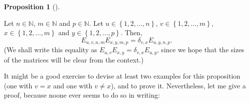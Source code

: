 \documentclass[numbers=enddot,12pt,final,onecolumn,notitlepage]{scrartcl}%
\theoremstyle{definition}
\newtheorem{prop}[theo]{Proposition}
\newenvironment{proposition}[1][]
{\begin{prop}[#1]\begin{leftbar}}
{\end{leftbar}\end{prop}}
\begin{document}
\begin{proposition}
\label{prop.Euv.prod}Let $n\in\mathbb{N}$, $m\in\mathbb{N}$ and $p\in
\mathbb{N}$. Let $u\in\left\{  1,2,\ldots,n\right\}  $, $v\in\left\{
1,2,\ldots,m\right\}  $, $x\in\left\{  1,2,\ldots,m\right\}  $ and
$y\in\left\{  1,2,\ldots,p\right\}  $. Then,
\[
E_{u,v,n,m}E_{x,y,m,p}=\delta_{v,x}E_{u,y,n,p}.
\]
(We shall write this equality as $E_{u,v}E_{x,y}=\delta_{v,x}E_{u,y}$, since
we hope that the sizes of the matrices will be clear from the context.)
\end{proposition}

It might be a good exercise to devise at least two examples for this
proposition (one with $v=x$ and one with $v\neq x$), and to prove it.
Nevertheless, let me give a proof, because noone ever seems to do so in writing:
\end{document}
